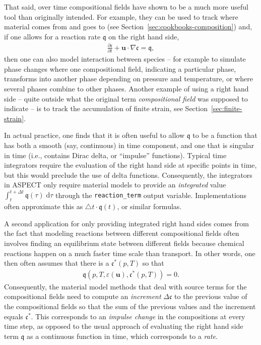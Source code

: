 \documentclass{article}
\newcommand{\aspect}{\textsc{ASPECT}}
\begin{document}
That said, over time compositional fields have shown to be a much more useful
tool than originally intended. For example, they can be used to track where
material comes from and goes to (see Section~\ref{sec:cookbooks-composition})
and, if one allows for a reaction rate $\mathfrak q$ on the right hand side,
\begin{align*}
  \frac{\partial \mathfrak c}{\partial t} + \mathbf u \cdot \nabla \mathfrak c
  = \mathfrak q,
\end{align*}
then one can also model interaction between species -- for example to simulate
phase changes where one compositional field, indicating a particular phase,
transforms into another phase depending on pressure and temperature, or where
several phases combine to other phases. Another example of using a
right hand side -- quite outside what the original term
\textit{compositional field} was supposed to indicate -- is to track
the accumulation of finite strain, see Section~\ref{sec:finite-strain}.

In actual practice, one finds that it is often useful to allow
$\mathfrak q$ to be a function that has both a smooth (say,
continuous) in time component, and one that is singular in time (i.e.,
contains Dirac delta, or ``impulse'' functions). Typical time
integrators require the evaluation of the right hand side at specific
points in time, but this would preclude the use of delta
functions. Consequently, the integrators in \aspect{} only require
material models to provide an \textit{integrated} value
$\int_t^{t+\Delta t} \mathfrak q(\tau) \;
\text{d}\tau$ through the {\tt reaction\_term} output
variable. Implementations often approximate this as $\triangle t \cdot
\mathfrak q(t)$, or similar formulas.

A second application for only providing integrated right hand sides
comes from the fact that
modeling reactions between different compositional fields often involves
finding an equilibrium state between different fields because
chemical reactions happen on a much faster time scale than transport. In other
words, one then often assumes that there is a $\mathfrak c^\ast(p,T)$ so that
\begin{align*}
  \mathfrak q(p,T,\varepsilon(\mathbf u),\mathfrak c^\ast(p,T)) = 0.
\end{align*}
Consequently, the material model methods that deal with source terms for the
compositional fields need to compute an \textit{increment} $\Delta\mathfrak c$
to the previous value of the compositional fields so that the sum of the
previous values and the increment equals $\mathfrak c^\ast$. This
corresponds to an \textit{impulse change} in the compositions at every
time step, as opposed
to the usual approach of evaluating the right hand side term
$\mathfrak q$ as a continuous function in time,
which corresponds to a \textit{rate}.
\end{document}
